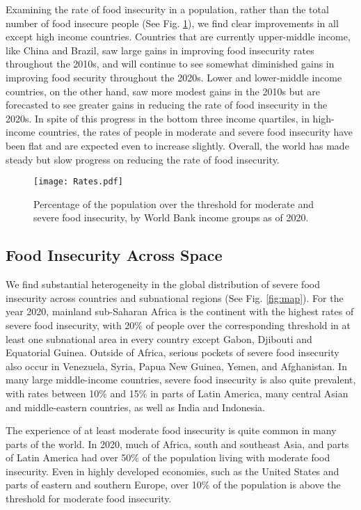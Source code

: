 \documentclass[titlepage]{article}
\begin{document}
Examining the rate of food insecurity in a population, rather than the total number of food insecure people (See Fig. \ref{fig:rates}), we find clear improvements in all except high income countries.  Countries that are currently upper-middle income, like China and Brazil, saw large gains in improving food insecurity rates throughout the 2010s, and will continue to see somewhat diminished gains in improving food security throughout the 2020s.  Lower and lower-middle income countries, on the other hand, saw more modest gains in the 2010s but are forecasted to see greater gains in reducing the rate of food insecurity in the 2020s.  In spite of this progress in the bottom three income quartiles, in high-income countries, the rates of people in moderate and severe food insecurity have been flat and are expected even to increase slightly.  Overall, the world has made steady but slow progress on reducing the rate of food insecurity.

\begin{figure}[H]
  \centering
  \texttt{[image: Rates.pdf]}
  \caption{Percentage of the population over the threshold for moderate and severe food insecurity, by World Bank income groups as of 2020.}
  \label{fig:rates}
\end{figure}


\subsection{Food Insecurity Across Space}
We find substantial heterogeneity in the global distribution of severe food insecurity across countries and subnational regions (See Fig. \ref{fig:map}).  For the year 2020, mainland sub-Saharan Africa is the continent with the highest rates of severe food insecurity, with 20\% of people over the corresponding threshold in at least one subnational area in every country except Gabon, Djibouti and Equatorial Guinea.  Outside of Africa, serious pockets of severe food insecurity also occur in Venezuela, Syria, Papua New Guinea, Yemen, and Afghanistan.  In many large middle-income countries, severe food insecurity is also quite prevalent, with rates between 10\% and 15\% in parts of Latin America, many central Asian and middle-eastern countries, as well as India and Indonesia.  

The experience of at least moderate food insecurity is quite common in many parts of the world.  In 2020, much of Africa, south and southeast Asia, and parts of Latin America had over 50\% of the population living with moderate food insecurity.  Even in highly developed economies, such as the United States and parts of eastern and southern Europe, over 10\% of the population is above the threshold for moderate food insecurity.
\end{document}
